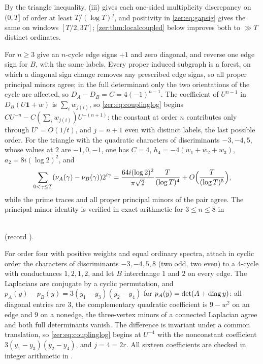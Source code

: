 By the triangle inequality, (iii) gives each one-sided multiplicity discrepancy on $(0,T]$ of order at
least $T/(\log T)^j$, and positivity in \eqref{zer:eq:gapsig} gives the same on windows $[T/2,3T]$;
\cref{zer:thm:localcoupled} below improves both to $\gg T$ distinct ordinates.

\begin{example}\label{zer:ex:couplingorders}
For $n\ge3$ give an $n$-cycle edge signs $+1$ and zero diagonal, and reverse one edge sign for $B$, with the
same labels. Every proper induced subgraph is a forest, on which a diagonal sign change removes any
prescribed edge signs, so all proper principal minors agree; in the full determinant only the two
orientations of the cycle are affected, so $D_A-D_B=C=4(-1)^{n-1}$. The coefficient of $U^{n-1}$ in
$D_B(U\mathbf 1+w)$ is $\sum_iw_{j(i)}$, so \eqref{zer:eq:couplinglog} begins
$CU^{-n}-C(\sum_iw_{j(i)})U^{-(n+1)}$: the constant at order $n$ contributes only through $U'=O(1/t)$, and
$j=n+1$ even with distinct labels, the last possible order. For the triangle with the quadratic characters
of discriminants $-3,-4,5$, whose values at $2$ are $-1,0,-1$, one has $C=4$, $h_4=-4(w_1+w_2+w_3)$, $a_2=8i(\log2)^2$, and
\[
 \sum_{0<\gamma\le T}(\nu_A(\gamma)-\nu_B(\gamma))2^{i\gamma}=\frac{64i(\log2)^2}{\pi\sqrt2}\frac T{(\log T)^4}+O\Bigl(\frac T{(\log T)^5}\Bigr),
\]
while the prime traces and all proper principal minors of the pair agree. The principal-minor identity is
verified in exact arithmetic for $3\le n\le8$ in
\begin{center}\\
(record ).\end{center}

For order four with positive weights and equal ordinary spectra, attach in cyclic order the characters
of discriminants $-3,-4,5,8$ (two odd, two even) to a $4$-cycle with conductances $1,2,1,2$, and let $B$
interchange $1$ and $2$ on every edge. The Laplacians are conjugate by a cyclic permutation, and
$p_A(y)-p_B(y)=3(y_1-y_3)(y_2-y_4)$ for $p_A(y)=\det(A+\operatorname{diag} y)$: all diagonal entries are $3$, the
complementary quadratic coefficient is $9-w^2$ on an edge and $9$ on a nonedge, the three-vertex minors of
a connected Laplacian agree and both full determinants vanish. The difference is invariant under a
common translation, so \eqref{zer:eq:couplinglog} begins at $U^{-4}$ with the nonconstant coefficient
$3(y_1-y_3)(y_2-y_4)$, and $j=4=2r$. All sixteen coefficients are checked in integer arithmetic in
.
\end{example}


